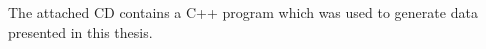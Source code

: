 
The attached CD contains a C++ program which was used to generate data presented in this thesis. 


